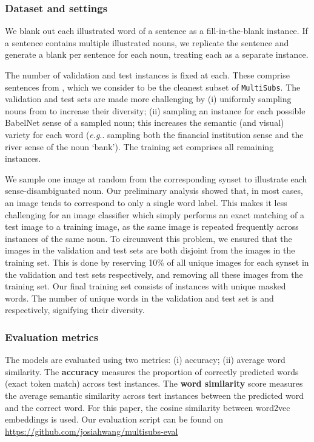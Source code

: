 \documentclass[twocolumn]{svjour3}          \smartqed  \usepackage{graphicx}
\makeatletter
\newcommand{\multisubs}{\texttt{MultiSubs}\xspace}
\DeclareRobustCommand\onedot{\futurelet\@let@token\@onedot}
\def\@onedot{\ifx\@let@token.\else.\null\fi\xspace}
\newcommand{\eg}{\emph{e.g}\onedot} \newcommand{\Eg}{\emph{E.g}\onedot}
\makeatother
\begin{document}
\subsubsection{Dataset and settings}
\label{sec:gapfilling-settings}

We blank out each illustrated word of a sentence as a fill-in-the-blank instance. If a sentence contains multiple illustrated nouns, we replicate the sentence and generate a blank per sentence for each noun, treating each as a separate instance. 

The number of validation and test instances is fixed at  each. These comprise sentences from \textbf{}, which we consider to be the cleanest subset of \multisubs. The validation and test sets are made more challenging by (i) uniformly sampling nouns from \textbf{} to increase their diversity; (ii) sampling an instance for each possible BabelNet sense of a sampled noun; this increases the semantic (and visual) variety for each word (\eg sampling both the financial institution sense and the river sense of the noun `bank'). The training set comprises all remaining instances. 

We sample one image at random from the corresponding synset to illustrate each sense-disambiguated noun. Our preliminary analysis showed that, in most cases, an image tends to correspond to only a single word label. This makes it less challenging for an image classifier which simply performs an exact matching of a test image to a training image, as the same image is repeated frequently across instances of the same noun. To circumvent this problem, we ensured that the images in the validation and test sets are both disjoint from the images in the training set. This is done by reserving 10\% of all unique images for each synset in the validation and test sets respectively, and removing all these images from the training set. Our final training set consists of  instances with  unique masked words. The number of unique words in the validation and test set is  and  respectively, signifying their diversity.



\subsubsection{Evaluation metrics}
\label{sec:gapfilling-metrics}

The models are evaluated using two metrics: (i) accuracy; (ii) average word similarity. The \textbf{accuracy} measures the proportion of correctly predicted words (exact token match) across test instances. The \textbf{word similarity} score measures the average semantic similarity across test instances between the predicted word and the correct word. For this paper, the cosine similarity between word2vec embeddings is used. Our evaluation script can be found on \url{https://github.com/josiahwang/multisubs-eval}
\end{document}
